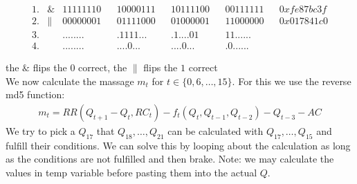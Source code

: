 \begin{align*}    
    1.& \& & 11111110 & & 10000111 & & 10111100 & & 00111111 & & 0xfe87bc3f \\
    2.& \| & 00000001 & & 01111000 & & 01000001 & & 11000000 & & 0x017841c0 \\
    3.&    & ........ & & .1111... & & .1....01 & & 11...... & &  \\
    4.&    & ........ & & ....0... & & ....0... & & .0...... & &  
\end{align*}

  the $\&$ flips the $0$ correct, the $\|$ flips the $1$ correct\\
We now calculate the massage $m_t$ for $t \in \{0,6,\dots,15\} $. For this we use the reverse md5 function:
\begin{align*}
    m_t = RR \left( Q_{t+1} - Q_t , RC_t\right) - f_t \left( Q_t, Q_{t-1}, Q_{t-2} \right) - Q_{t-3} - AC
\end{align*}
\hfill
\newpage
We try to pick a $Q_{17}$ that $Q_{18}, \dots, Q_{21}$ can be calculated with $Q_{17},\dots,Q_{15}$ and fulfill their conditions. 
We can solve this by looping about the calculation as long as the conditions are not fulfilled and then brake. Note: we may calculate the values in temp variable before pasting them into the actual $Q$.\\
